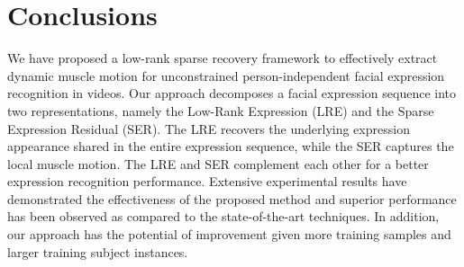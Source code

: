 \documentclass[journal]{IEEEtran}
\begin{document}
\section{Conclusions\label{sec:conclude}}
We have proposed a low-rank sparse recovery framework to effectively extract dynamic muscle motion for unconstrained person-independent facial expression recognition in videos. Our approach decomposes a facial expression sequence into two representations, namely the Low-Rank Expression (LRE) and the Sparse Expression Residual (SER). The LRE recovers the underlying expression appearance shared in the entire expression sequence, while the SER captures the local muscle motion. The LRE and SER complement each other for a better expression recognition performance. Extensive experimental results have demonstrated the effectiveness of the proposed method and superior performance has been observed as compared to the state-of-the-art techniques. In addition, our approach has the potential of improvement given more training samples and larger training subject instances. 

\ifCLASSOPTIONcaptionsoff
  \newpage
\fi




\end{document}
